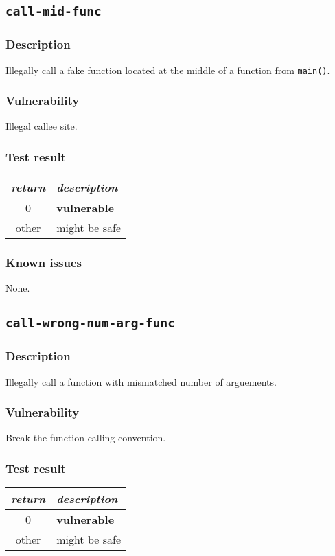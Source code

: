 \documentclass[a4paper]{book}
\begin{document}
\newpage
\subsection{\texttt{call-mid-func}}\label{test-call-mid-func}

\subsubsection{Description}
Illegally call a fake function located at the middle of a function from \texttt{main()}.

\subsubsection{Vulnerability}
Illegal callee site.

\subsubsection{Test result}
\begin{tabular}{cl}
  \toprule
  \emph{return}  & \emph{description} \\
  \midrule
  0              & \textbf{vulnerable} \\
  other          & might be safe \\
  \bottomrule
\end{tabular}
  
\subsubsection{Known issues}

None.

\newpage
\subsection{\texttt{call-wrong-num-arg-func}}\label{test-call-wrong-num-arg-func}

\subsubsection{Description}
Illegally call a function with mismatched number of arguements.

\subsubsection{Vulnerability}
Break the function calling convention.

\subsubsection{Test result}
\begin{tabular}{cl}
  \toprule
  \emph{return}  & \emph{description} \\
  \midrule
  0              & \textbf{vulnerable} \\
  other          & might be safe \\
  \bottomrule
\end{tabular}
\end{document}
